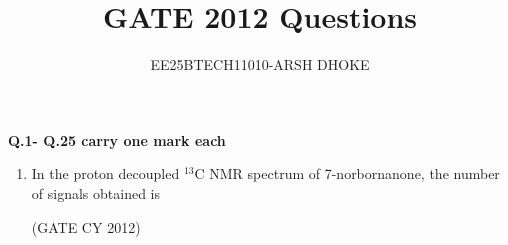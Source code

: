\documentclass[12pt]{article}
\author{EE25BTECH11010-ARSH DHOKE}
\title{GATE 2012 Questions}
\date{}
\begin{document}
\maketitle

\textbf{Q.1- Q.25 carry one mark each}
\begin{enumerate}

\item In the proton decoupled $^{13}$C NMR spectrum of 7-norbornanone, the number of signals obtained is  
\begin{enumerate}
\end{enumerate}
\hfill (GATE CY 2012)


\end{enumerate}
\end{document}
